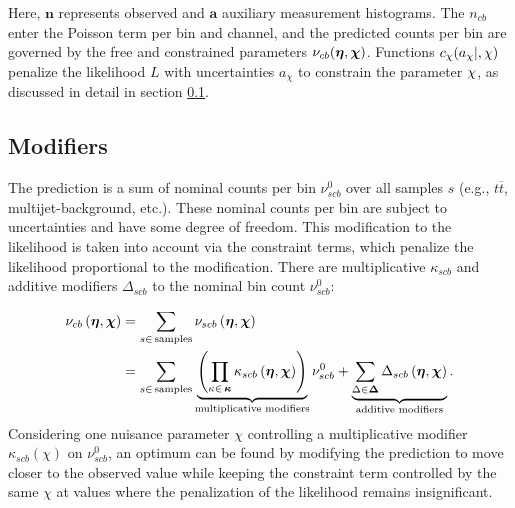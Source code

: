Here, $\bm{n}$ represents observed and $\bm{a}$ auxiliary measurement histograms. The $n_{cb}$ enter the Poisson term per bin and channel, and the predicted counts per bin are governed by the free and constrained parameters $\nu_{cb}(\bm{\eta},\bm{\chi})$. Functions $c_{\chi}(a_{\chi} |, \chi)$ penalize the likelihood $L$ with uncertainties $a_\chi$ to constrain the parameter $\chi$, as discussed in detail in section \ref{sec:modifiers}.

\subsection{Modifiers}\label{sec:modifiers}
The prediction is a sum of nominal counts per bin $\nu_{scb}^0$ over all samples $s$ (e.g., $t\overline{t}$, multijet-background, etc.). These nominal counts per bin are subject to uncertainties and have some degree of freedom. This modification to the likelihood is taken into account via the constraint terms, which penalize the likelihood proportional to the modification. There are multiplicative $\kappa_{scb}$ and additive modifiers $\Delta_{scb}$ to the nominal bin count $\nu_{scb}^0$:

\begin{align}
    \nu_{cb}\left(\bm{\eta},\bm{\chi}\right) & = \sum_{s\in\mathrm{\,samples}} \nu_{scb}\left(\bm{\eta},\bm{\chi}\right)                                                                                                \\
                                             & = \sum_{s\in\mathrm{\,samples}} \underbrace{\left(\prod_{\kappa\in\,\bm{\kappa}} \kappa_{scb}\left(\bm{\eta},\bm{\chi}\right)\right)}_{\text{multiplicative modifiers}} \nu_{scb}^0 +
    \underbrace{\sum_{\Delta\in\bm{\Delta}} \Delta_{scb}\left(\bm{\eta},\bm{\chi}\right)}_{\text{additive modifiers}}.
    \label{eq:modifier_equation}
\end{align}    
Considering one nuisance parameter $\chi$ controlling a multiplicative modifier $\kappa_{scb}(\chi)$ on $\nu_{scb}^0$, an optimum can be found by modifying the prediction to move closer to the observed value while keeping the constraint term controlled by the same $\chi$ at values where the penalization of the likelihood remains insignificant.

